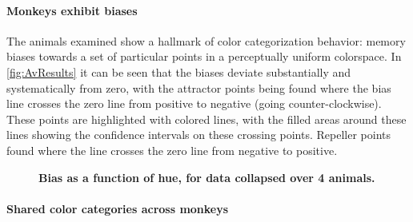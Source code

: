 \paragraph{Monkeys exhibit biases} %

The animals examined show a hallmark of color categorization behavior: memory biases towards a set of particular points in a perceptually uniform colorspace.
In \autoref{fig:AvResults} it can be seen that the biases deviate substantially and systematically from zero, with the attractor points being found where the bias line crosses the zero line from positive to negative (going counter-clockwise). These points are highlighted with colored lines, with the filled areas around these lines showing the confidence intervals on these crossing points. Repeller points found where the line crosses the zero line from negative to positive.

\begin{figure}
    \centering
        \begin{subfigure}[b]{0.29\textwidth}
         \centering
         \caption{}
         
         \label{fig:CombinedLinear}
    \end{subfigure}
    \hfill
    \begin{subfigure}[b]{0.39\textwidth}
         \centering
         \caption{}
         
         \label{fig:CombinedLinear}
    \end{subfigure}
    \hfill
    \begin{subfigure}[b]{0.29\textwidth}
         \centering
         \caption{}
         
         \label{fig:CombinedPolar}
    \end{subfigure}
    \caption{\textbf{Bias as a function of hue, for data collapsed over 4 animals.} 
    }
    \label{fig:AvResults}
\end{figure}

\paragraph{Shared color categories across monkeys}

